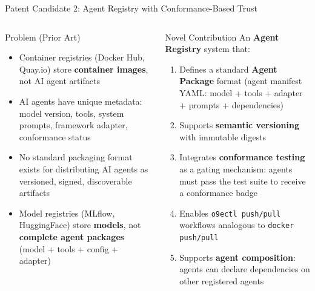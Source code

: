 \begin{frame}{\fontsize{9}{11}\selectfont Patent Candidate 2: Agent Registry with Conformance-Based Trust}
  \vspace{-0.3cm}

  \fontsize{5.5}{6.5}\selectfont
  \begin{columns}[T]
    \begin{alertblock}{\fontsize{5.5}{6.5}\selectfont Problem (Prior Art)}
      \fontsize{5.5}{6.5}\selectfont
      \begin{itemize}
        \setlength{\itemsep}{0pt}
        \item Container registries (Docker Hub, Quay.io) store \textbf{container images},
              not AI agent artifacts
        \item AI agents have unique metadata: model version, tools, system prompts,
              framework adapter, conformance status
        \item No standard packaging format exists for distributing AI agents as
              versioned, signed, discoverable artifacts
        \item Model registries (MLflow, HuggingFace) store \textbf{models}, not
              \textbf{complete agent packages} (model + tools + config + adapter)
      \end{itemize}
    \end{alertblock}

    \begin{block}{\fontsize{5.5}{6.5}\selectfont Novel Contribution}
      \fontsize{5.5}{6.5}\selectfont
      An \textbf{Agent Registry} system that:
      \begin{enumerate}
        \setlength{\itemsep}{0pt}
        \item Defines a standard \textbf{Agent Package} format (agent manifest
              YAML: model + tools + adapter + prompts + dependencies)
        \item Supports \textbf{semantic versioning} with immutable digests
        \item Integrates \textbf{conformance testing} as a gating mechanism:
              agents must pass the test suite to receive a conformance badge
        \item Enables \texttt{o9ectl push/pull} workflows analogous to
              \texttt{docker push/pull}
        \item Supports \textbf{agent composition}: agents can declare
              dependencies on other registered agents
      \end{enumerate}
    \end{block}


\end{columns}
\end{frame}
